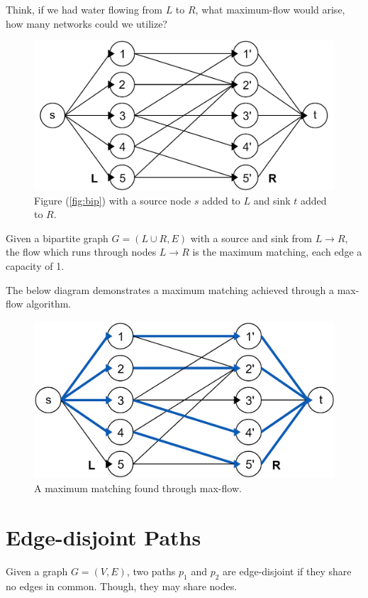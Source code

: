 \noindent
Think, if we had water flowing from $L$ to $R$, what maximum-flow would arise, how many networks could we utilize?

\begin{figure}[h]
    \centering
    \includegraphics[width=.5\textwidth]{Sections/net/bipflow.png}
    \caption{Figure (\ref{fig:bip}) with a source node $s$ added to $L$ and sink $t$ added to $R$.}
\end{figure}

\noindent
\begin{theo}

    Given a bipartite graph $G=(L\cup R,E)$ with a source and sink from $L\to R$, the flow which runs through nodes $L\to R$ is the maximum matching, each edge a capacity of 1.  
\end{theo}

\newpage 
\noindent

The below diagram demonstrates a maximum matching achieved through a max-flow algorithm.

\begin{figure}[h]
    \centering
    \includegraphics[width=.45\textwidth]{Sections/net/bipmax.png}
    \caption{A maximum matching found through max-flow.}
\end{figure}

\vspace{-1.5em}
\section{Edge-disjoint Paths}
\begin{Def}

    Given a graph $G=(V,E)$, two paths $p_1$ and $p_2$ are edge-disjoint if they share no edges in common. Though, 
    they may share nodes.
\end{Def}

